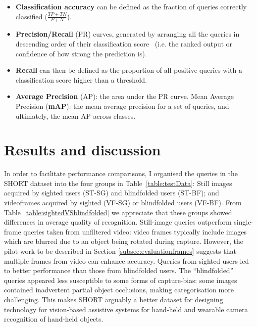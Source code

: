 \begin{itemize}

\item \textbf{Classification accuracy} can be defined as the fraction of queries correctly classified ($\frac{TP+TN}{P+N}$). 

\item \textbf{Precision/Recall} (PR) curves, generated by arranging all the queries in descending order of their classification score~\cite{everingham2010pascal} (i.e. the ranked output or confidence of how strong the prediction is). 

\item \textbf{Recall} can then be defined as the proportion of all positive queries with a classification score higher than a threshold. 

\item \textbf{Average Precision} (AP): the area under the PR curve. Mean Average Precision (\textbf{mAP}): the mean average precision for a set of queries, and ultimately, the mean AP across classes.

\end{itemize}


\section{Results and discussion} \label{sec:analysis} \label{sec:results}


In order to facilitate performance comparisons, I organised the queries in the SHORT dataset into the four groups in Table~\ref{table:testData}: Still images acquired by sighted users (ST-SG) and blindfolded users (ST-BF); and videoframes acquired by sighted (VF-SG) or blindfolded users (VF-BF). From Table~\ref{table:sightedVSblindfolded} we appreciate that these groups showed differences in average quality of recognition. Still-image queries outperform single-frame queries taken from unfiltered video: video frames typically include images which are blurred due to an object being rotated during capture. However, the pilot work to be described in Section \ref{subsec:evaluationframes} suggests that multiple frames from video can enhance accuracy. Queries from sighted users led to better performance than those from blindfolded users. The ``blindfolded'' queries appeared less susceptible to some forms of  capture-bias: some images contained inadvertent partial object occlusions, making categorisation more challenging. This makes SHORT arguably a better dataset for designing technology for vision-based assistive systems for hand-held and wearable camera recognition of hand-held objects.


